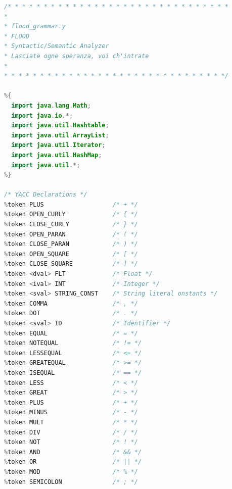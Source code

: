 \documentclass[12pt]{report}
\begin{document}
\begin{singlespace}
\begin{lstlisting}[language=Java,label=some-code,caption={flood$\_$grammar.y}]
/* * * * * * * * * * * * * * * * * * * * * * * * * * * * * * *
*
* flood_grammar.y
* FLOOD
* Syntactic/Semantic Analyzer
* Lasciate ogne speranza, voi ch'intrate
*
* * * * * * * * * * * * * * * * * * * * * * * * * * * * * * */

%{
  import java.lang.Math;
  import java.io.*;
  import java.util.Hashtable;
  import java.util.ArrayList;
  import java.util.Iterator;
  import java.util.HashMap;
  import java.util.*;
%}

/* YACC Declarations */
%token PLUS                   /* + */
%token OPEN_CURLY             /* { */ 
%token CLOSE_CURLY            /* } */
%token OPEN_PARAN             /* ( */
%token CLOSE_PARAN            /* ) */
%token OPEN_SQUARE            /* [ */
%token CLOSE_SQUARE           /* ] */
%token <dval> FLT             /* Float */
%token <ival> INT             /* Integer */
%token <sval> STRING_CONST    /* String literal onstants */
%token COMMA                  /* , */
%token DOT                    /* . */
%token <sval> ID              /* Identifier */
%token EQUAL                  /* = */
%token NOTEQUAL               /* != */
%token LESSEQUAL              /* <= */
%token GREATEQUAL             /* >= */
%token ISEQUAL                /* == */
%token LESS                   /* < */
%token GREAT                  /* > */
%token PLUS                   /* + */
%token MINUS                  /* - */
%token MULT                   /* * */
%token DIV                    /* / */
%token NOT                    /* ! */
%token AND                    /* && */
%token OR                     /* || */
%token MOD                    /* % */
%token SEMICOLON              /* ; */


\end{lstlisting}
\end{singlespace}
\end{document}
